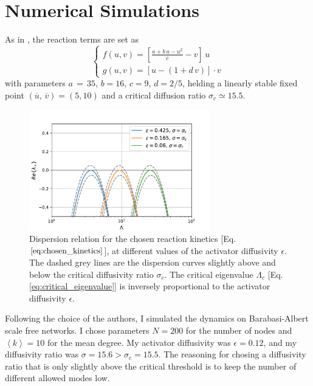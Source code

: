 \section{Numerical Simulations}
As in \cite{main_network}, the reaction terms are set as
\begin{equation}
    \begin{cases}
        f(u,v) = [\frac{a + b\,u -u^2}{c} - v]\, u \\
        g(u, v) = [u - (1+ d\,v)]\cdot v 
    \end{cases}
\label{eq:chosen_kinetics}
\end{equation}
with parameters $a\,=\,35,\, b=16,\, c= 9,\, d= 2/5$, 
helding a linearly stable fixed point $(\overline{u},\, \overline{v}) = (5, 10)$ and a critical diffusion ratio $\sigma_c \simeq 15.5$. \newline \noindent
\begin{figure}[H]
    \centering
    \includegraphics[width=0.7\textwidth]{latex_source/images/turing/multiple_dispersion.pdf}
    \caption{ Dispersion relation for the chosen reaction kinetics [Eq. $\ref{eq:chosen_kinetics}$], at different values of the activator diffusivity $\epsilon$. The dashed grey lines are the dispersion curves slightly above and below the critical diffusivity ratio $\sigma_c$. The critical eigenvalue $\Lambda_c$ [Eq. \ref{eq:critical_eigenvalue}] is inversely proportional to the activator diffusivity $\epsilon$.}
\end{figure}
Following the choice of the authors, I simulated the dynamics on Barabasi-Albert scale free networks. I chose parameters $N = 200$ for the number of nodes and $\left \langle k \right \rangle = 10$ for the mean degree. My activator diffusivity was $\epsilon = 0.12$, and my diffusivity ratio was $\sigma = 15.6 > \sigma_c = 15.5$. The reasoning for chosing a diffusivity ratio that is only slightly above the critical threshold is to keep the number of different allowed modes low.
